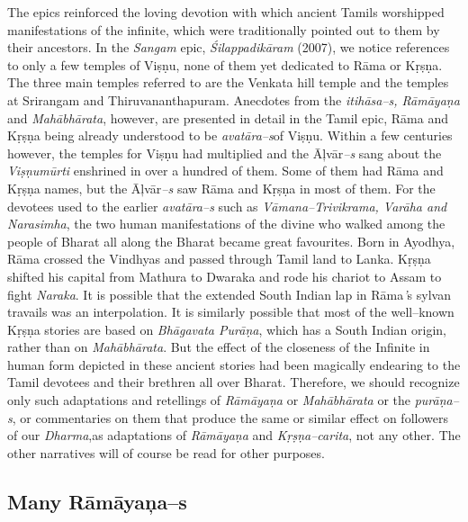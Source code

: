 The epics reinforced the loving devotion with which ancient Tamils worshipped manifestations of the infinite, which were traditionally pointed out to them by their ancestors. In the \textit{Sangam} epic, \textit{Śilappadikāram} (2007), we notice references to only a few temples of Viṣṇu, none of them yet dedicated to Rāma or Kṛṣṇa. The three main temples referred to are the Venkata hill temple and the temples at Srirangam and Thiruvananthapuram. Anecdotes from the \textit{itihāsa–s, Rāmāyaṇa} and \textit{Mahābhārata}, however, are presented in detail in the Tamil epic, Rāma and Kṛṣṇa being already understood to be \textit{avatāra–s}\break of Viṣṇu. Within a few centuries however, the temples for Viṣṇu had multiplied and the Āļvār\textit{–s} sang about the \textit{Viṣṇumūrti} enshrined in over a hundred of them. Some of them had Rāma and Kṛṣṇa names, but the Āļvār\textit{–s} saw Rāma and Kṛṣṇa in most of them. For the devotees used to the earlier \textit{avatāra–s} such as \textit{Vāmana–Trivikrama, Varāha and Narasimha}, the two human manifestations of the divine who walked among the people of Bharat all along the Bharat became great favourites. Born in Ayodhya, Rāma crossed the Vindhyas and passed through Tamil land to Lanka. Kṛṣṇa shifted his capital from Mathura to Dwaraka and rode his chariot to Assam to fight \textit{Naraka}. It is possible that the extended South Indian lap in Rāma\textit{’}s sylvan travails was an interpolation. It is similarly possible that most of the well–known Kṛṣṇa stories are based on \textit{Bhāgavata Purāṇa}, which has a South Indian origin, rather than on \textit{Mahābhārata}. But the effect of the closeness of the Infinite in human form depicted in these ancient stories had been magically endearing to the Tamil devotees and their brethren all over Bharat. Therefore, we should recognize only such adaptations and retellings of \textit{Rāmāyaṇa} or \textit{Mahābhārata} or the \textit{purāṇa–s}, or commentaries on them that produce the same or similar effect on followers of our \textit{Dharma},as adaptations of \textit{Rāmāyaṇa} and \textit{Kṛṣṇa–carita}, not any other. The other narratives will of course be read for other purposes.


\subsection*{Many Rāmāyaņa–s}

